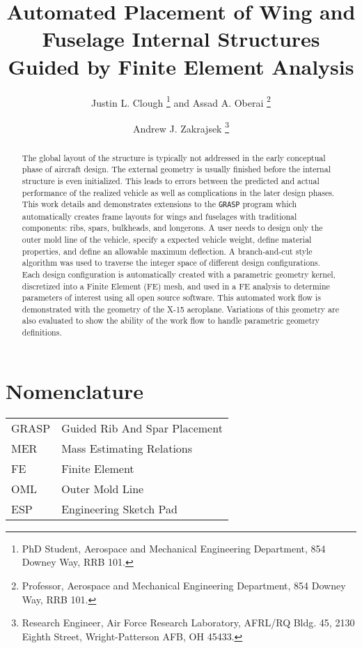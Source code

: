\documentclass[conf]{new-aiaa}
\title{Automated Placement of Wing and Fuselage 
      Internal Structures Guided by Finite Element Analysis}
\author{Justin L. Clough%
        \footnote{
          PhD Student, 
          Aerospace and Mechanical Engineering Department, 
          854 Downey Way, RRB 101.}
        and Assad A. Oberai%
        \footnote{  
          Professor, 
          Aerospace and Mechanical Engineering Department, 
          854 Downey Way, RRB 101.}}
\affil{University of Southern California,
       Los Angeles, CA, 90089}
\author{Andrew J. Zakrajsek%
        \footnote{
          Research Engineer,
          Air Force Research Laboratory, AFRL/RQ
          Bldg. 45, 2130 Eighth Street,
          Wright-Patterson AFB, OH 45433.}}
\affil{AFRL/RQHV, Wright-Patterson AFB,
       Dayton, OH, 45433}
\begin{document}
\maketitle

\begin{abstract}
The global layout of the structure is typically not addressed
in the early conceptual phase of aircraft design.
The external geometry is usually finished before the 
internal structure is even initialized.
This leads to errors between the predicted and 
actual performance of the realized vehicle as well as
complications in the later design phases.
This work details and demonstrates extensions
to the \texttt{GRASP} program which automatically 
creates frame layouts for wings and fuselages
with traditional components: ribs, spars, bulkheads, and longerons.
A user needs to design only the outer mold line of the 
vehicle, specify a expected vehicle weight, 
define material properties,
and define an allowable maximum deflection.
A branch-and-cut style algorithm was used
to traverse the integer space of 
different design configurations.
Each design configuration is automatically
created with a parametric geometry kernel,
discretized into a Finite Element (FE) mesh,
and used in a FE analysis to determine 
parameters of interest using all open source software.
This automated work flow is demonstrated with the 
geometry of the X-15 aeroplane.
Variations of this geometry are also evaluated
to show the ability of the work flow to 
handle parametric geometry definitions.
\end{abstract}

\section{Nomenclature}

{\renewcommand\arraystretch{1.0}
\noindent\begin{longtable*}{@{}l @{\quad=\quad} l@{}}
GRASP & Guided Rib And Spar Placement \\
MER   & Mass Estimating Relations \\
FE    & Finite Element \\
OML   & Outer Mold Line \\
ESP   & Engineering Sketch Pad
\end{longtable*}}
\end{document}
